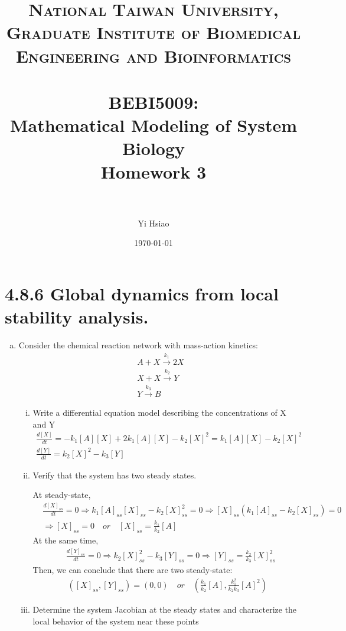 \documentclass[paper=a4, fontsize=11pt]{scrartcl} %
\title{	
\normalfont \normalsize 
\textsc{National Taiwan University, \\ Graduate Institute of Biomedical Engineering and Bioinformatics} \\ [25pt] %
\horrule{0.5pt} \\[0.4cm] %
\huge BEBI5009:\\Mathematical Modeling of System Biology \\ Homework 3 \\ %
\horrule{2pt} \\[0.5cm] %
}
\author{Yi Hsiao} %
\date{\normalsize\today} %
\numberwithin{equation}{section} %
\numberwithin{figure}{section} %
\numberwithin{table}{section} %
\begin{document}
\maketitle %

\newpage
\section{4.8.6 Global dynamics from local stability analysis.}
	\begin{enumerate}[a)]
		\item Consider the chemical reaction network with mass-action kinetics:
		\begin{gather*}
			A + X \xrightarrow{k_1} 2X \\
			X + X \xrightarrow{k_2} Y \\
			Y \xrightarrow{k_3} B
		\end{gather*}
		\begin{enumerate}[i)]
			\item Write a differential equation model describing the concentrations of X and Y
			\begin{gather*}
				\frac{d[X]}{dt} = -k_1[A][X]+2k_1[A][X]-k_2[X]^2=k_1[A][X]-k_2[X]^2\\
				\frac{d[Y]}{dt} = k_2[X]^2-k_3[Y]
			\end{gather*}

			\item Verify that the system has two steady states.

			At steady-state,
			\begin{align*}
				&\frac{d[X]_{ss}}{dt}=0 \Rightarrow k_1[A]_{ss}[X]_{ss}-k_2[X]^2_{ss}=0 \Rightarrow [X]_{ss}(k_1[A]_{ss}-k_2[X]_{ss})=0 \\
				&\Rightarrow [X]_{ss}=0 \quad or \quad [X]_{ss}=\frac{k_1}{k_2}[A]
			\end{align*}
			At the same time,
			\begin{align*}
				&\frac{d[Y]_{ss}}{dt}=0 \Rightarrow k_2[X]^2_{ss}-k_3[Y]_{ss}=0 \Rightarrow [Y]_{ss}=\frac{k_2}{k_3}[X]^2_{ss}
			\end{align*}
			Then, we can conclude that there are two steady-state:
			\begin{align*}
				([X]_{ss},[Y]_{ss})=(0,0) \quad or \quad (\frac{k_1}{k_2}[A],\frac{k^2_1}{k_2k_3}[A]^2)
			\end{align*}
			\item Determine the system Jacobian at the steady states and characterize the local behavior of the system near these points


\end{enumerate}
\end{enumerate}
\end{document}
